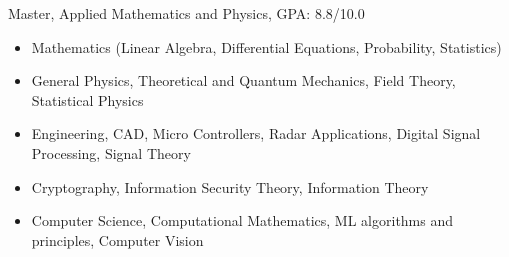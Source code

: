 \documentclass[10pt,a4paper]{cv}
\begin{document}
Master, Applied Mathematics and Physics,
GPA: 8.8/10.0

\begin{itemize}
\item Mathematics (Linear Algebra, Differential Equations, Probability, Statistics)
\item General Physics, Theoretical and Quantum Mechanics, Field Theory, Statistical Physics
\item Engineering, CAD, Micro Controllers, Radar Applications, Digital Signal Processing, Signal Theory
\item Cryptography, Information Security Theory, Information Theory
\item Computer Science, Computational Mathematics, ML algorithms and principles, Computer Vision
\end{itemize}

\divider



 

\clearpage
\end{document}
